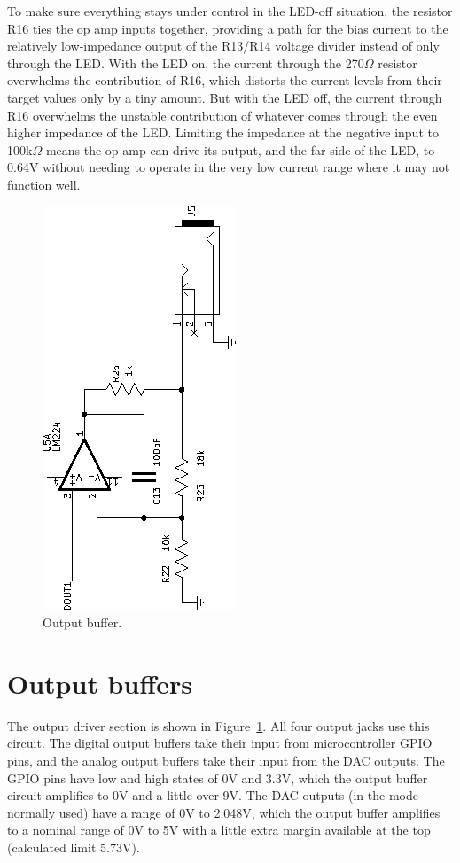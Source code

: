 To make sure everything stays under control in the LED-off situation, the
resistor R16 ties the op amp inputs together, providing a path for the bias
current to the relatively low-impedance output of the R13/R14 voltage
divider instead of only through the LED.  With the LED on, the current
through the 270$\Omega$ resistor overwhelms the contribution of R16, which
distorts the current levels from their target values only by a tiny amount. 
But with the LED off, the current through R16 overwhelms the unstable
contribution of whatever comes through the even higher impedance of the LED. 
Limiting the impedance at the negative input to 100k$\Omega$ means the op
amp can drive its output, and the far side of the LED, to 0.64V without
needing to operate in the very low current range where it may not function
well.

\begin{figure}
{\centering\includegraphics[scale=2,rotate=-90]{opamp3.eps}\par}
\caption{Output buffer.}\label{fig:out-buffer}
\end{figure}

\section{Output buffers}

The output driver section is shown in Figure~\ref{fig:out-buffer}.  All four
output jacks use this circuit.  The digital output buffers take their input
from microcontroller GPIO pins, and the analog output buffers take their
input from the DAC outputs.  The GPIO pins have low and high states of 0V
and 3.3V, which the output buffer circuit amplifies to 0V and a little over
9V.  The DAC outputs (in the mode normally used) have a range of 0V to
2.048V, which the output buffer amplifies to a nominal range of 0V to 5V
with a little extra margin available at the top (calculated limit 5.73V).

